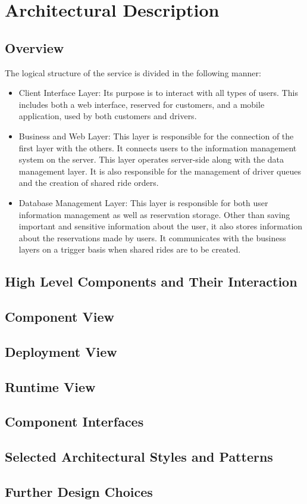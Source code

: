 \section{Architectural Description}

\subsection{Overview}
	The logical structure of the service is divided in the following manner:
	\begin{itemize}
		\item{Client Interface Layer:} Its purpose is to interact with all types of users. This includes both a web interface, reserved for customers, and a mobile application,
			used by both customers and drivers.
		\item{Business and Web Layer:} This layer is responsible for the connection of the first layer with the others. It connects users to the information management
			system on the server. This layer operates server-side along with the data management layer. It is also responsible for the management of driver queues and 
			the creation of shared ride orders. 
		\item{Database Management Layer:} This layer is responsible for both user information management as well as reservation storage. Other than saving important and sensitive
			information about the user, it also stores information about the reservations made by users. It communicates with the business layers on a trigger basis when shared rides
			are to be created.
	\end{itemize}
\subsection{High Level Components and Their Interaction}

\subsection{Component View}

\subsection{Deployment View}

\subsection{Runtime View}

\subsection{Component Interfaces}

\subsection{Selected Architectural Styles and Patterns}

\subsection{Further Design Choices}

